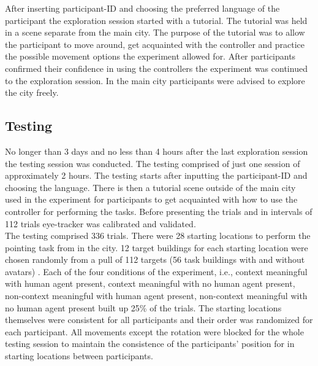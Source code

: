 After inserting participant-ID and choosing the preferred language of the participant the exploration session started with a tutorial. The tutorial was held in a scene separate from the main city. The purpose of the tutorial was to allow the participant to move around, get acquainted with the controller and practice the possible movement options the experiment allowed for. After participants confirmed their confidence in using the controllers the experiment was continued to the exploration session. In the main city participants were advised to explore the city freely.

\subsection{Testing}

No longer than 3 days and no less than 4 hours after the last exploration session the testing session was conducted. The testing comprised of just one session of approximately 2 hours. The testing starts after inputting the participant-ID and choosing the language. There is then a tutorial scene outside of the main city used in the experiment for participants to get acquainted with how to use the controller for performing the tasks. Before presenting the trials and in intervals of 112 trials eye-tracker was calibrated and validated. \\

The testing comprised 336 trials. There were 28 starting locations to perform the pointing task from in the city. 12 target buildings for each starting location were chosen randomly from a pull of 112 targets (56 task buildings with and without avatars) . Each of the four conditions of the experiment, i.e., context meaningful with human agent present, context meaningful with no human agent present, non-context meaningful with human agent present, non-context meaningful with no human agent present built up 25\% of the trials.  The starting locations themselves were consistent for all participants and their order was randomized for each participant. All movements except the rotation were blocked for the whole testing session to maintain the consistence of the participants' position for in starting locations between participants. \\

